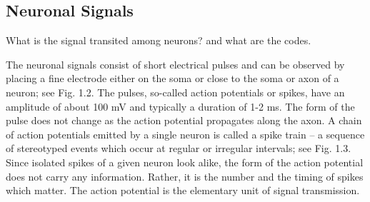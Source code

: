 %



\subsection{Neuronal Signals}

What is the signal transited among neurons?
and what are the codes.

The neuronal signals consist of short electrical pulses and can be observed by placing a fine electrode either on the soma or close to the soma or axon of a neuron; see Fig. 1.2. The pulses, so-called action potentials or spikes, have an amplitude of about 100 mV and typically a duration of 1-2 ms. The form of the pulse does not change as the action potential propagates along the axon. A chain of action potentials emitted by a single neuron is called a spike train – a sequence of stereotyped events which occur at regular or irregular intervals; see Fig. 1.3. Since isolated spikes of a given neuron look alike, the form of the action potential does not carry any information. Rather, it is the number and the timing of spikes which matter. The action potential is the elementary unit of signal transmission.

